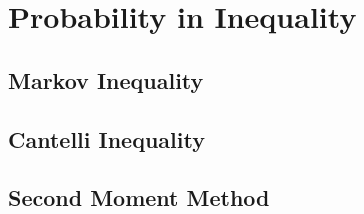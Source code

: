 \documentclass[inequalities.tex]{subfile}
\begin{document}
	\chapter{Probability in Inequality}\label{ch:prob}
	
	\section{Markov Inequality}
	
	\section{Cantelli Inequality}
	
	\section{Second Moment Method}
\end{document}
